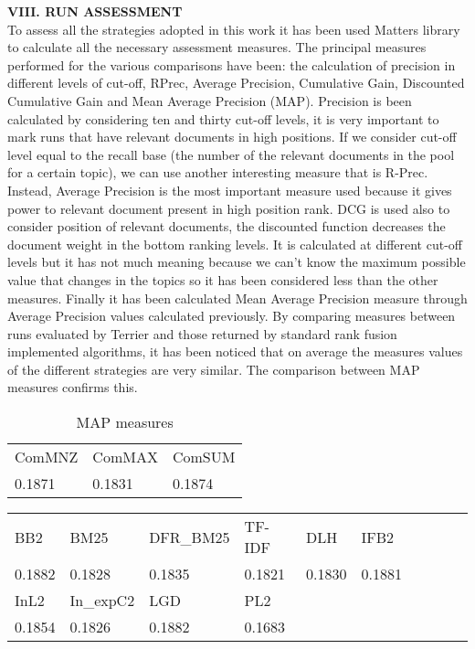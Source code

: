 \documentclass[12pt,journal]{IEEEtran}
\begin{document}
\textbf{VIII.	RUN ASSESSMENT} \\
To assess all the strategies adopted in this work it has been used Matters library to calculate all the necessary assessment measures.
The principal measures performed for the various comparisons have been: the calculation of precision in different levels of cut-off, RPrec, Average Precision, Cumulative Gain, Discounted Cumulative Gain and Mean Average Precision (MAP).
Precision is been calculated by considering ten and thirty cut-off levels, it is very important to mark runs that have relevant documents in high positions. If we consider cut-off level equal to the recall base (the number of the relevant documents in the pool for a certain topic), we can use another interesting measure that is R-Prec.
Instead, Average Precision is the most important measure used because it gives power to relevant document present in high position rank.
DCG is used also to consider position of relevant documents, the discounted function decreases the document weight in the bottom ranking levels. It is calculated at different cut-off levels but it has not much meaning because we can’t know the maximum possible value that changes in the topics so it has been considered less than the other measures. Finally it has been calculated Mean Average Precision measure through Average Precision values calculated previously.
By comparing measures between runs evaluated by Terrier and those returned by standard rank fusion implemented algorithms, it has been noticed that on average the measures values of the different strategies are very similar. The comparison between MAP measures confirms this.

\begin{table}[h!]
\centering
\caption{MAP measures}
\begin{tabular}{|l|l|l|}
\hline
ComMNZ & ComMAX & ComSUM \\
0.1871 & 0.1831 & 0.1874 \\ \hline
\end{tabular}
\end{table}

\begin{table}[h!]
\centering
\begin{tabular}{|l|l|l|l|l|l|l|l|l|l|}
\hline
BB2    & BM25   & DFR\_BM25 & TF-IDF & DLH & IFB2     \\
0.1882 & 0.1828 & 0.1835    & 0.1821 & 0.1830 & 0.1881 \\ \hline
InL2   & In\_expC2 & LGD    & PL2    &        &       \\
0.1854 & 0.1826    & 0.1882 & 0.1683 &        & \\ \hline
\end{tabular}
\end{table}
\end{document}
